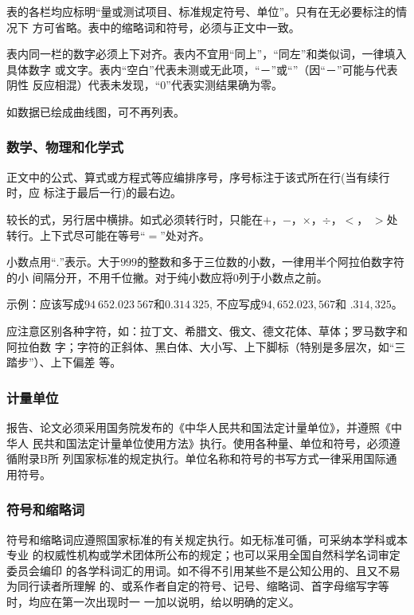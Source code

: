 \documentclass[master]{njuthesis}
\begin{document}
表的各栏均应标明“量或测试项目、标准规定符号、单位”。只有在无必要标注的情况下
方可省略。表中的缩略词和符号，必须与正文中一致。

表内同一栏的数字必须上下对齐。表内不宜用“同上”，“同左”和类似词，一律填入具体数字
或文字。表内“空白”代表未测或无此项，“－”或“\textellipsis”（因“－”可能与代表阴性
  反应相混）代表未发现，“0”代表实测结果确为零。

如数据已绘成曲线图，可不再列表。

\subsubsection{数学、物理和化学式}

正文中的公式、算式或方程式等应编排序号，序号标注于该式所在行(当有续行时，应
标注于最后一行)的最右边。

较长的式，另行居中横排。如式必须转行时，只能在$+$，$-$，$\times$，$\div$，$<$，
$>$处转行。上下式尽可能在等号“$=$”处对齐。

小数点用“$.$”表示。大于$999$的整数和多于三位数的小数，一律用半个阿拉伯数字符的小
间隔分开，不用千位撇。对于纯小数应将$0$列于小数点之前。

示例：应该写成$94\ 652.023\ 567$和$0.314\ 325$, 不应写成$94,652.023,567$和
$.314,325$。

应注意区别各种字符，如：拉丁文、希腊文、俄文、德文花体、草体；罗马数字和阿拉伯数
字；字符的正斜体、黑白体、大小写、上下脚标（特别是多层次，如“三踏步”）、上下偏差
等。

\subsubsection{计量单位}

报告、论文必须采用国务院发布的《中华人民共和国法定计量单位》，并遵照《中华人
民共和国法定计量单位使用方法》执行。使用各种量、单位和符号，必须遵循附录B所
列国家标准的规定执行。单位名称和符号的书写方式一律采用国际通用符号。

\subsubsection{符号和缩略词}

符号和缩略词应遵照国家标准的有关规定执行。如无标准可循，可采纳本学科或本专业
的权威性机构或学术团体所公布的规定；也可以采用全国自然科学名词审定委员会编印
的各学科词汇的用词。如不得不引用某些不是公知公用的、且又不易为同行读者所理解
的、或系作者自定的符号、记号、缩略词、首字母缩写字等时，均应在第一次出现时一
一加以说明，给以明确的定义。
\end{document}
